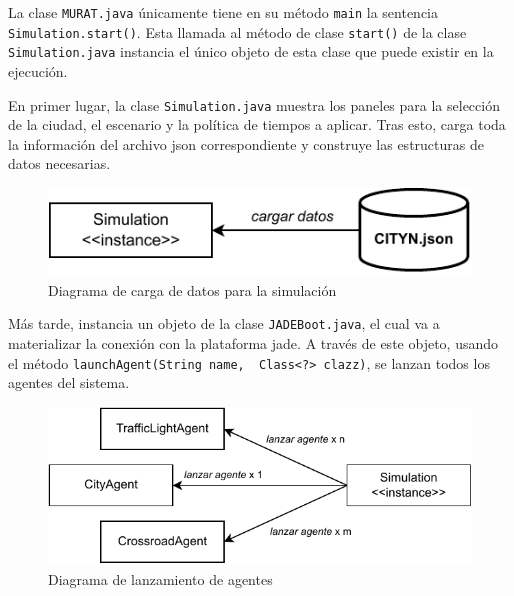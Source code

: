 La clase \lstinline{MURAT.java} únicamente tiene en su método \lstinline{main} la sentencia \lstinline{Simulation.start()}. Esta llamada al método de clase \lstinline{start()} de la clase \lstinline{Simulation.java} instancia el único objeto de esta clase que puede existir en la ejecución.


En primer lugar, la clase \lstinline{Simulation.java} muestra los paneles para la selección de la ciudad, el escenario y la política de tiempos a aplicar. Tras esto, carga toda la información del archivo \acrshort{json} correspondiente y construye las estructuras de datos necesarias. 
\begin{figure}[H]
    \centering
    \includegraphics[width=0.8\linewidth]{text/image/D-Carga_de_datos.pdf}
    \caption{Diagrama de carga de datos para la simulación}
    \label{fig:diagrama_carga_datos}
\end{figure}

Más tarde, instancia un objeto de la clase \lstinline{JADEBoot.java}, el cual va a materializar la conexión con la plataforma \acrshort{jade}. A través de este objeto, usando el método \lstinline{launchAgent(String name,  Class<?> clazz)}, se lanzan todos los agentes del sistema.
\begin{figure}[H]
    \centering
    \includegraphics[width=1\linewidth]{text/image/D-Lanzamiento_de_agentes.pdf}
    \caption{Diagrama de lanzamiento de agentes}
    \label{fig:diagrama_lanzamiento_agentes}
\end{figure}

